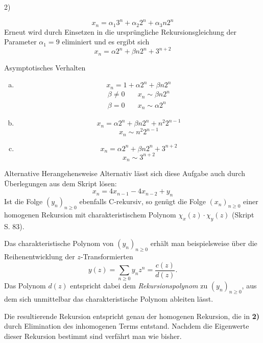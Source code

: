 \begin{paragraph}{2)}
\begin{enumerate}[(a)]
      \[ x_{n} = \alpha_{1}3^{n} + \alpha_{2}2^{n} + \alpha_{3}n2^{n} \]
      Erneut wird durch Einsetzen in die ursprüngliche Rekursionsgleichung der
      Parameter $\alpha_{1} = 9$ eliminiert und es ergibt sich
      \[ x_{n} = \alpha 2^{n} + \beta n2^{n} + 3^{n+2} \]
  \end{enumerate}
  \begin{subparagraph}{Asymptotisches Verhalten}
    \begin{enumerate}[(a)]
      \item \[ x_{n} = 1 + \alpha 2^{n} + \beta n2^{n} \]
        \begin{equation*}
          \begin{split}
           \beta \not= 0 &\quad x_{n} \sim \beta n2^{n} \\
           \beta = 0     &\quad x_{n} \sim \alpha 2^{n}
          \end{split}
        \end{equation*}
      \item \[ x_{n} = \alpha2^{n} + \beta n2^{n} + n^{2}2^{n-1}\]
        \[ x_{n} \sim n^{2}2^{n-1} \]
      \item \[ x_{n} = \alpha 2^{n} + \beta n2^{n} + 3^{n+2} \]
        \[ x_{n} \sim 3^{n+2} \]
    \end{enumerate}
  \end{subparagraph}
  \begin{subparagraph}{Alternative Herangehensweise}
	Alternativ lässt sich diese Aufgabe auch durch Überlegungen aus dem
	Skript lösen:
	\[ x_{n} = 4x_{n-1} - 4x_{n-2} + y_{n} \]
	Ist die Folge $(y_n)_{n\geq 0}$ ebenfalls C-rekursiv, so genügt die
	Folge $(x_n)_{n\geq 0}$ einer homogenen Rekursion mit
	charakteristischem Polynom $\chi_x(z)\cdot\chi_y(z)$ (Skript S. 83).

	Das charakteristische Polynom von $(y_n)_{n\geq 0}$ erhält man
	beispielsweise über die Reihenent\-wicklung der $z$-Transformierten
	\[ y(z) = \sum_{n\geq 0} y_n z^n = \frac{c(z)}{d(z)}. \]
	Das Polynom $d(z)$ entspricht dabei dem \textit{Rekursionspolynom} zu
	$(y_n)_{n\geq 0}$, aus dem sich unmittelbar das charakteristische
	Polynom ableiten lässt.

	Die resultierende Rekursion entspricht genau der homogenen Rekursion,
	die in \textbf{2)} durch Elimination des inhomogenen Terms entstand.
	Nachdem die Eigenwerte dieser Rekursion bestimmt sind verfährt man wie
	bisher.
  \end{subparagraph}
\end{paragraph}
